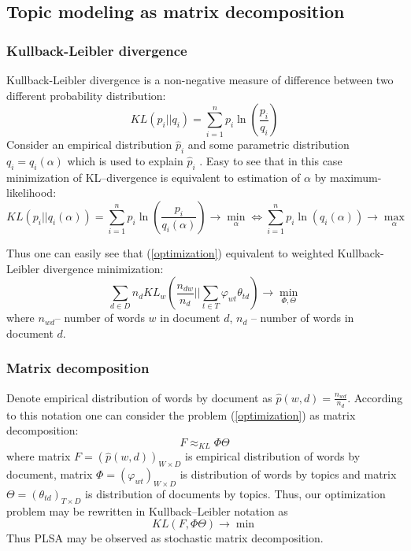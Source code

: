     \subsection{Topic modeling as matrix decomposition} \label{matrixDecomposition}

	\subsubsection{Kullback-Leibler divergence}
	    Kullback-Leibler divergence is a non-negative measure of difference between two different probability distribution:
	    \begin{equation} KL(p_i||q_i) = \sum_{i=1}^n p_i \ln\left(\frac{p_i}{q_i}\right)  \end{equation}
	    Consider an empirical distribution $\hat{p}_i$ and some parametric distribution $q_i = q_i(\alpha)$ which is used to explain $\hat{p}_i$ .
	    Easy to see that in this case minimization of KL\---divergence is equivalent to estimation of $\alpha$ by maximum-likelihood:
	    \begin{equation} KL(p_i||q_i(\alpha)) = \sum_{i=1}^n p_i \ln\left(\frac{p_i}{q_i(\alpha)}\right) \to \min_{\alpha}
	    \Leftrightarrow \sum_{i=1}^n p_i \ln(q_i(\alpha)) \to \max_{\alpha} \end{equation}

	    Thus one can easily see that (\ref{optimization}) equivalent to weighted Kullback-Leibler divergence minimization:
	    \begin{equation}
		\sum_{d \in D} n_d KL_w \left( \frac{n_{dw}}{n_d} || \sum_{t \in T} \varphi_{wt}\theta_{td} \right) \to \min_{\Phi, \Theta}
	    \end{equation}
		where $n_{wd}$\--- number of words $w$ in document $d$, $n_d$ \--- number of words in document $d$.

	\subsubsection{Matrix decomposition}
	    Denote empirical distribution of words by document as $\hat{p}(w, d) = \frac{n_{wd}}{n_d}$.
	    According to this notation one can consider the problem (\ref{optimization}) as matrix decomposition:
	    \begin{equation} F \approx_{KL} \Phi \Theta \end{equation}
	    where matrix $F = (\hat{p}(w, d))_{W \times D}$ is empirical distribution of words by document,
	    matrix $\Phi = (\varphi_{wt})_{W \times D}$ is distribution of words by topics and
	    matrix  $\Theta = (\theta_{td})_{T\times D}$ is distribution of documents by topics.
	    Thus, our optimization problem may be rewritten in Kullback–Leibler notation as
	    \begin{equation} KL(F , \Phi \Theta) \rightarrow \min \end{equation}
	    Thus PLSA may be observed as stochastic matrix decomposition.

